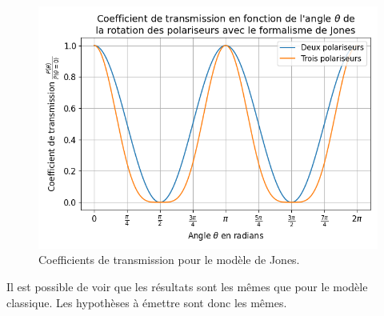 \documentclass[11pt,letterpaper]{article}
\begin{document}
\begin{figure}[H]
  \centering
  \includegraphics[scale=0.7]{coeff_jones.png}
  \caption{Coefficients de transmission pour le modèle de Jones.}
  \label{jones}
\end{figure}

Il est possible de voir que les résultats sont les mêmes que pour le modèle classique. Les hypothèses à émettre
sont donc les mêmes.


\clearpage

%
%
\end{document}
